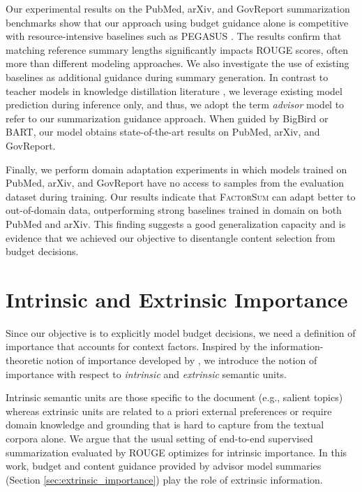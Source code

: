 \documentclass[11pt,table]{article}
\newcommand{\modelname}{FactorSum}
\begin{document}
Our experimental results on the PubMed, arXiv, and GovReport summarization benchmarks \citep{cohan2018discourse, huang2021efficient} show that our approach using budget guidance alone is competitive with resource-intensive baselines such as PEGASUS \citep{zhang2020pegasus}. The results confirm that matching reference summary lengths significantly impacts ROUGE scores, often more than different modeling approaches.
We also investigate the use of existing baselines as additional guidance during summary generation. In contrast to teacher models in knowledge distillation literature \citep{hinton2015distilling}, we leverage existing model prediction during inference only, and thus, we adopt the term \emph{advisor} model to refer to our summarization guidance approach. When guided by BigBird or BART, our model obtains state-of-the-art results on PubMed, arXiv, and GovReport.

Finally, we perform domain adaptation experiments in which models trained on PubMed, arXiv, and GovReport have no access to samples from the evaluation dataset during training. Our results indicate that \textsc{\modelname} can adapt better to out-of-domain data, outperforming strong baselines trained in domain on both PubMed and arXiv. This finding suggests a good generalization capacity and is evidence that we achieved our objective to disentangle content selection from budget decisions.

\section{Intrinsic and Extrinsic Importance}
\label{sec:methods}
Since our objective is to explicitly model budget decisions, we need a definition of importance that accounts for context factors. Inspired by the information-theoretic notion of importance developed by , we introduce the notion of importance with respect to \emph{intrinsic} and \emph{extrinsic} semantic units.

Intrinsic semantic units are those specific to the document (e.g., salient topics) whereas extrinsic units are related to a priori external preferences or require domain knowledge and grounding that is hard to capture from the textual corpora alone. We argue that the usual setting of end-to-end supervised summarization evaluated by ROUGE \citep{lin2004rouge} optimizes for intrinsic importance. In this work, budget and content guidance provided by advisor model summaries (Section \ref{sec:extrinsic_importance}) play the role of extrinsic information.
\end{document}

